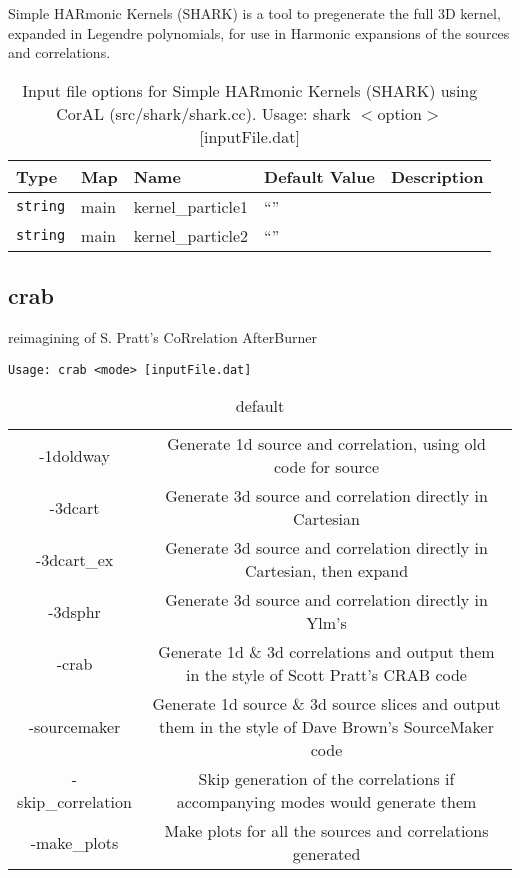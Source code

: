 \documentclass[10pt]{article}
\begin{document}
Simple HARmonic Kernels (SHARK)  is a tool to pregenerate the full 3D kernel, expanded in Legendre polynomials, 
for use in Harmonic expansions of the sources and correlations.
        \begin{table}
            \begin{tabular}{lllll}
                \hline\hline
                Type & Map & Name & Default Value & Description \\
                \hline\hline 
                {\tt string} & main & kernel\_particle1 & ``'' & \\\hline
                {\tt string} & main & kernel\_particle2 & ``'' & \\\hline
            \end{tabular}
            \caption{Input file options for Simple HARmonic Kernels (SHARK) using CorAL (src/shark/shark.cc). Usage: shark $<$option$>$ [inputFile.dat]}
            \label{sharkCLOptions}
        \end{table}


\subsection{crab}
reimagining of S. Pratt's CoRrelation AfterBurner

{\tt Usage: crab <mode> [inputFile.dat]}
\begin{table}
\caption{default}
\begin{center}
\begin{tabular}{|c|c|}
	-1doldway		& Generate 1d source and correlation, using old code for source\\
	-3dcart       	& Generate 3d source and correlation directly in Cartesian\\
	-3dcart\_ex    	& Generate 3d source and correlation directly in Cartesian, then expand\\
	-3dsphr       	& Generate 3d source and correlation directly in Ylm's\\
	-crab        	 	&  Generate 1d \& 3d correlations and output them in the style of Scott Pratt's CRAB code\\
	-sourcemaker  	& Generate 1d source \& 3d source slices and output them in the style of Dave Brown's SourceMaker code\\
	-skip\_correlation  & Skip generation of the correlations if accompanying modes would generate them\\
	-make\_plots   & Make plots for all the sources and correlations generated\\
\end{tabular}
\end{center}
\label{crabCLOptions}
\end{table}
\end{document}
